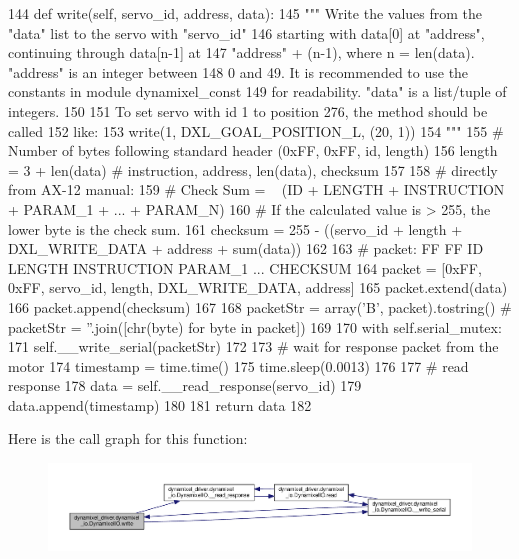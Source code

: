 \begin{DoxyCode}
144     \textcolor{keyword}{def }write(self, servo\_id, address, data):
145         \textcolor{stringliteral}{""" Write the values from the "data" list to the servo with "servo\_id"}
146 \textcolor{stringliteral}{        starting with data[0] at "address", continuing through data[n-1] at}
147 \textcolor{stringliteral}{        "address" + (n-1), where n = len(data). "address" is an integer between}
148 \textcolor{stringliteral}{        0 and 49. It is recommended to use the constants in module dynamixel\_const}
149 \textcolor{stringliteral}{        for readability. "data" is a list/tuple of integers.}
150 \textcolor{stringliteral}{}
151 \textcolor{stringliteral}{        To set servo with id 1 to position 276, the method should be called}
152 \textcolor{stringliteral}{        like:}
153 \textcolor{stringliteral}{            write(1, DXL\_GOAL\_POSITION\_L, (20, 1))}
154 \textcolor{stringliteral}{        """}
155         \textcolor{comment}{# Number of bytes following standard header (0xFF, 0xFF, id, length)}
156         length = 3 + len(data)  \textcolor{comment}{# instruction, address, len(data), checksum}
157 
158         \textcolor{comment}{# directly from AX-12 manual:}
159         \textcolor{comment}{# Check Sum = ~ (ID + LENGTH + INSTRUCTION + PARAM\_1 + ... + PARAM\_N)}
160         \textcolor{comment}{# If the calculated value is > 255, the lower byte is the check sum.}
161         checksum = 255 - ((servo\_id + length + DXL\_WRITE\_DATA + address + sum(data)) %
162 
163         \textcolor{comment}{# packet: FF  FF  ID LENGTH INSTRUCTION PARAM\_1 ... CHECKSUM}
164         packet = [0xFF, 0xFF, servo\_id, length, DXL\_WRITE\_DATA, address]
165         packet.extend(data)
166         packet.append(checksum)
167 
168         packetStr = array(\textcolor{stringliteral}{'B'}, packet).tostring() \textcolor{comment}{# packetStr = ''.join([chr(byte) for byte in packet])}
169 
170         with self.serial\_mutex:
171             self.\_\_write\_serial(packetStr)
172 
173             \textcolor{comment}{# wait for response packet from the motor}
174             timestamp = time.time()
175             time.sleep(0.0013)
176 
177             \textcolor{comment}{# read response}
178             data = self.\_\_read\_response(servo\_id)
179             data.append(timestamp)
180 
181         \textcolor{keywordflow}{return} data
182 
\end{DoxyCode}
Here is the call graph for this function\+:
\nopagebreak
\begin{figure}[H]
\begin{center}
\leavevmode
\includegraphics[width=350pt]{dd/d77/classdynamixel__driver_1_1dynamixel__io_1_1_dynamixel_i_o_a32049f3a322d37054032b9d44be39192_cgraph}
\end{center}
\end{figure}
